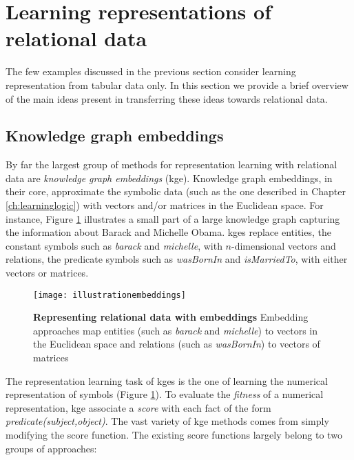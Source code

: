 \section{Learning representations of relational data}


The few examples discussed in the previous section consider learning representation from tabular data only.
In this section we provide a brief overview of the main ideas present in transferring these ideas towards relational data.


\subsection{Knowledge graph embeddings}


By far the largest group of methods for representation learning with relational data are \textit{knowledge graph embeddings} (\gls{kge}).
Knowledge graph embeddings, in their core, approximate the symbolic data (such as the one described in Chapter \ref{ch:learninglogic}) with vectors and/or matrices in the Euclidean space.
For instance, Figure \ref{fig:emb} illustrates a small part of a large knowledge graph capturing the information about Barack and Michelle Obama.
\gls{kge}s replace entities, the constant symbols such as \textit{barack} and \textit{michelle}, with $n$-dimensional vectors and relations, the predicate symbols such as \textit{wasBornIn} and \textit{isMarriedTo}, with either vectors or matrices.

 \begin{figure}
	\centering
	\texttt{[image: illustrationembeddings]}
	\caption[Representing relational data with embeddings]{\textbf{Representing relational data with embeddings} Embedding approaches map entities (such as \textit{barack} and \textit{michelle}) to vectors in the Euclidean space and relations (such as \textit{wasBornIn}) to vectors of matrices}
	\label{fig:emb}
\end{figure}




The representation learning task of \gls{kge}s is the one of learning the numerical representation of symbols (Figure \ref{fig:emb}).
To evaluate the \textit{fitness} of a numerical representation, \gls{kge} associate a \textit{score} with each fact of the form \textit{predicate(subject,object)}.
The vast variety of \gls{kge} methods comes from simply modifying the score function.
The existing score functions largely belong to two groups of approaches:

